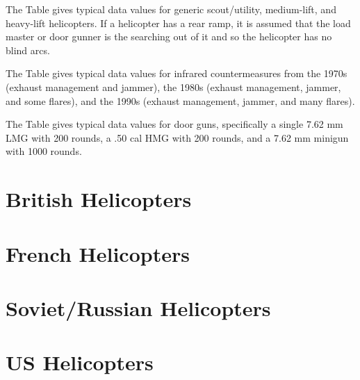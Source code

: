 The Table gives typical data values for generic scout/utility, medium-lift, and heavy-lift helicopters. If a helicopter has a rear ramp, it is assumed that the load master or door gunner is the searching out of it and so the helicopter has no blind arcs.

The Table gives typical data values for infrared countermeasures from the 1970s (exhaust management and jammer), the 1980s (exhaust management, jammer, and some flares), and the 1990s (exhaust management, jammer, and many flares).

The Table gives typical data values for door guns, specifically a single 7.62 mm LMG with 200 rounds, a .50 cal HMG with 200 rounds, and a 7.62 mm minigun with 1000 rounds.


\section{British Helicopters}








\section{French Helicopters}






\section{Soviet/Russian Helicopters}






\section{US Helicopters}











